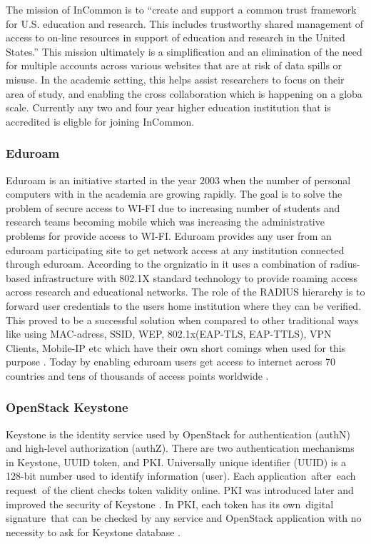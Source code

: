      The mission of InCommon is to ``create and support a common trust
     framework for U.S. education and research.  This includes
     trustworthy shared management of access to on-line resources in
     support of education and research in the United
     States.'' \cite{www-incommon} This mission ultimately is a
     simplification and an elimination of the need for multiple
     accounts across various websites that are at risk of data spills
     or misuse.  In the academic setting, this helps assist
     researchers to focus on their area of study, and enabling the
     cross collaboration which is happening on a globa scale.
     Currently any two and four year higher education institution that
     is accredited is eligble for joining InCommon.

\subsubsection{Eduroam}

     Eduroam is an initiative started in the year 2003 when the number
     of personal computers with in the academia are growing
     rapidly. The goal is to solve the problem of secure access to
     WI-FI due to increasing number of students and research teams
     becoming mobile which was increasing the administrative problems
     for provide access to WI-FI. Eduroam provides any user from an
     eduroam participating site to get network access at any
     institution connected through eduroam. According to the
     orgnizatio in it uses a combination of radius-based infrastructure
     with 802.1X standard technology to provide roaming access across
     research and educational networks. The role of the RADIUS
     hierarchy is to forward user credentials to the users home
     institution where they can be verified. This proved to be a
     successful solution when compared to other traditional ways like
     using MAC-adress, SSID, WEP, 802.1x(EAP-TLS, EAP-TTLS), VPN
     Clients, Mobile-IP etc which have their own short comings when
     used for this purpose \cite{eduroam-paper-2005}. Today by
     enabling eduroam users get access to internet across 70 countries
     and tens of thousands of access points worldwide \cite{www-eduroam}.


\subsubsection{OpenStack Keystone}

     \cite{www-keystone-wiki} Keystone is the identity service used
     by OpenStack for authentication (authN) and high-level
     authorization (authZ).  There are two authentication mechanisms
     in Keystone, UUID token, and PKI.  Universally unique identifier
     (UUID) is a 128-bit number used to identify information
     (user). Each application after each request of the client checks
     token validity online. PKI was introduced later and improved the
     security of Keystone \cite{cui2015security}. In PKI, each token
     has its own digital signature that can be checked by any service
     and OpenStack application with no necessity to ask for Keystone
     database \cite{www-cloudberrylab-kstn}.
 
